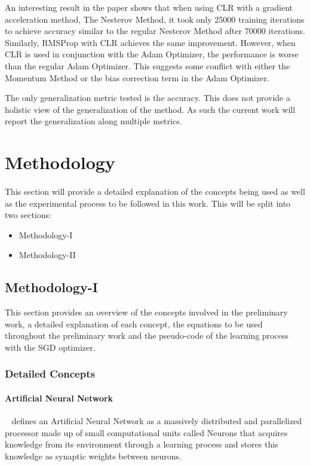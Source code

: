 \documentclass{article}
\begin{document}
An interesting result in the paper shows that when using CLR with a gradient acceleration method, The Nesterov Method, it took only 25000 training iterations to achieve accuracy similar to the regular Nesterov Method after 70000 iterations. Similarly, RMSProp with CLR achieves the same improvement. However, when CLR is used in conjunction with the Adam Optimizer, the performance is worse than the regular Adam Optimizer. This suggests some conflict with either the Momentum Method or the bias correction term in the Adam Optimizer. 

The only generalization metric tested is the accuracy. This does not provide a holistic view of the generalization of the method. As such the current work will report the generalization along multiple metrics.  
	


 

  
\section{Methodology}
\paragraph{} This section will provide a detailed explanation of the concepts being used as well as the experimental process to be followed in this work. This will be split into two sections:
\begin{itemize}
	\item Methodology-I
	\item Methodology-II
\end{itemize}

\subsection{Methodology-I}
This section provides an overview of the concepts involved in the preliminary work, a detailed explanation of each concept, the equations to be used throughout the preliminary work and the pseudo-code of the learning process with the SGD optimizer. 
\subsubsection{Detailed Concepts}
\paragraph{Artificial Neural Network}~\cite{ANNDefinition} defines an Artificial Neural Network as a massively distributed and parallelized processor made up of small computational units called Neurons that acquires knowledge from its environment through a learning process and stores this knowledge as synaptic weights between neurons. 
\end{document}
